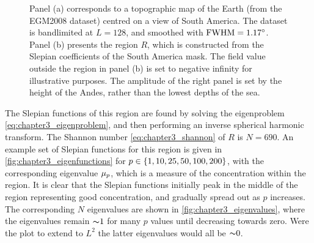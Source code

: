\begin{figure}[htp]
	\centering
	\hfill
	\caption{
		Panel (a) corresponds to a topographic map of the Earth (from the EGM2008 dataset) centred on a view of South America.
		The dataset is bandlimited at \(L=128\), and smoothed with \(\text{FWHM}=\SI{1.17}{\degree}\).
		Panel (b) presents the region \(R\), which is constructed from the Slepian coefficients of the South America mask.
		The field value outside the region in panel (b) is set to negative infinity for illustrative purposes.
		The amplitude of the right panel is set by the height of the Andes, rather than the lowest depths of the sea.
	}\label{fig:chapter3_south_america_region}
\end{figure}

The Slepian functions of this region are found by solving the eigenproblem \cref{eq:chapter3_eigenproblem}, and then performing an inverse spherical harmonic transform.
The Shannon number \cref{eq:chapter3_shannon} of \(R\) is \(N=690\).
An example set of Slepian functions for this region is given in \cref{fig:chapter3_eigenfunctions} for \(p \in \{1, 10, 25, 50, 100, 200\}\), with the corresponding eigenvalue \({\mu}_{p}\), which is a measure of the concentration within the region.
It is clear that the Slepian functions initially peak in the middle of the region representing good concentration, and gradually spread out as \(p\) increases.
The corresponding \(N\) eigenvalues are shown in \cref{fig:chapter3_eigenvalues}, where the eigenvalues remain \({\thicksim}1\) for many \(p\) values until decreasing towards zero.
Were the plot to extend to \(L^{2}\) the latter eigenvalues would all be \({\thicksim}0\).

